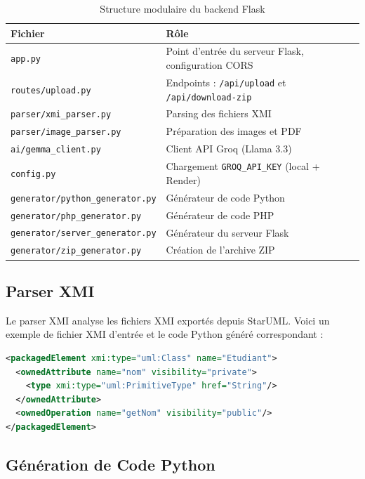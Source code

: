 \begin{table}[htbp]
\centering
\renewcommand{\arraystretch}{1.4}
\begin{tabular}{|l|p{8cm}|}
\hline
\rowcolor{gray!30}
\textbf{Fichier} & \textbf{Rôle} \\
\hline
\texttt{app.py} & Point d'entrée du serveur Flask, configuration CORS \\
\hline
\texttt{routes/upload.py} & Endpoints : \texttt{/api/upload} et \texttt{/api/download-zip} \\
\hline
\texttt{parser/xmi\_parser.py} & Parsing des fichiers XMI \\
\hline
\texttt{parser/image\_parser.py} & Préparation des images et PDF \\
\hline
\texttt{ai/gemma\_client.py} & Client API Groq (Llama 3.3) \\
\hline
\texttt{config.py} & Chargement \texttt{GROQ\_API\_KEY} (local + Render) \\
\hline
\texttt{generator/python\_generator.py} & Générateur de code Python \\
\hline
\texttt{generator/php\_generator.py} & Générateur de code PHP \\
\hline
\texttt{generator/server\_generator.py} & Générateur du serveur Flask \\
\hline
\texttt{generator/zip\_generator.py} & Création de l'archive ZIP \\
\hline
\end{tabular}
\caption{Structure modulaire du backend Flask}
\end{table}

\subsection{Parser XMI}

Le parser XMI analyse les fichiers XMI exportés depuis StarUML. Voici un exemple de fichier XMI d'entrée et le code Python généré correspondant :

\begin{lstlisting}[language=XML, caption=Exemple de fichier XMI d'entrée]
<packagedElement xmi:type="uml:Class" name="Etudiant">
  <ownedAttribute name="nom" visibility="private">
    <type xmi:type="uml:PrimitiveType" href="String"/>
  </ownedAttribute>
  <ownedOperation name="getNom" visibility="public"/>
</packagedElement>
\end{lstlisting}

\subsection{Génération de Code Python}

